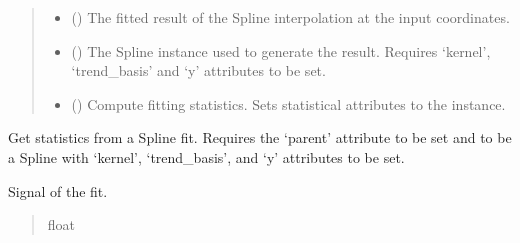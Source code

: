 \documentclass[letterpaper,10pt,english]{sphinxmanual}
\begin{document}
\begin{fulllineitems}
\begin{quote}
\begin{description}
\begin{itemize}
\item {}
\sphinxAtStartPar
{} () \textendash{} The fitted result of the Spline interpolation at the input coordinates.

\item {}
\sphinxAtStartPar
{} () \textendash{} The Spline instance used to generate the result. Requires ‘kernel’,
‘trend\_basis’ and ‘y’ attributes to be set.

\item {}
\sphinxAtStartPar
{} () \textendash{} Compute fitting statistics. Sets statistical attributes to the instance.

\end{itemize}

\end{description}\end{quote}

\begin{fulllineitems}
\label{\detokenize{splines:glomar_gridding.spline.SplineResult.fit_stats}}
\pysigstartsignatures
\pysiglinewithargsret
{}
{}
{}
\pysigstopsignatures
\sphinxAtStartPar
Get statistics from a Spline fit. Requires the ‘parent’ attribute to
be set and to be a Spline with ‘kernel’, ‘trend\_basis’, and ‘y’
attributes to be set.

\begin{fulllineitems}
\label{\detokenize{splines:glomar_gridding.spline.SplineResult.signal}}
\pysigstartsignatures
\pysigline
{}
\pysigstopsignatures
\sphinxAtStartPar
Signal of the fit.
\begin{quote}\begin{description}
\sphinxAtStartPar
float

\end{description}\end{quote}


\end{fulllineitems}
\end{fulllineitems}
\end{fulllineitems}
\end{document}
